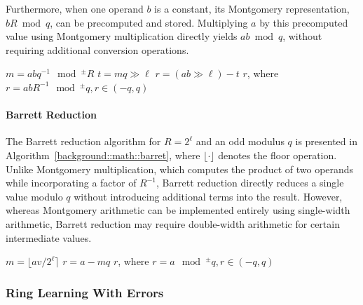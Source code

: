 Furthermore, when one operand $b$ is a constant, its Montgomery representation, $bR \bmod q$, can be precomputed and stored. Multiplying $a$ by this precomputed value using Montgomery multiplication directly yields $ab \bmod q$, without requiring additional conversion operations.

\begin{algorithm}[!ht]
\caption{Montgomery Modular Multiplication}
\label{background::math::montgomery}
\footnotesize
\begin{algorithmic}[1]
\State $m = ab q^{-1} \mod^{\pm} R$\;
\State $t = m q \gg \ell $\;
\State $r = (ab \gg \ell) - t$\;
\State \Return $r$, where $r = abR^{-1} \mod^{\pm} q, r \in (-q, q)$ \;
\EndProcedure
\end{algorithmic}
\end{algorithm}

\paragraph{Barrett Reduction}

The Barrett reduction algorithm for $R = 2^\ell$ and an odd modulus $q$ is presented in Algorithm~\ref{background::math::barret}, where $\lfloor \cdot \rfloor$ denotes the floor operation. Unlike Montgomery multiplication, which computes the product of two operands while incorporating a factor of $R^{-1}$, Barrett reduction directly reduces a single value modulo $q$ without introducing additional terms into the result. However, whereas Montgomery arithmetic can be implemented entirely using single-width arithmetic, Barrett reduction may require double-width arithmetic for certain intermediate values.

\begin{algorithm}[!ht]
\caption{Barrett Reduction}
\label{background::math::barret}
\footnotesize
\begin{algorithmic}[1]
\State $m = \lfloor a v/ 2^\ell \rceil $\;
\State $r = a - m q$\;
\State \Return $r$, where $r = a \mod^\pm q, r \in (-q, q)$\;
\EndProcedure
\end{algorithmic}
\end{algorithm}

\subsubsection{Ring Learning With Errors}

